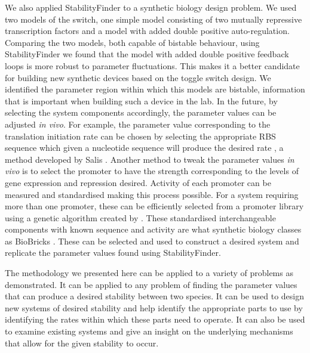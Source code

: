 We also applied StabilityFinder to a synthetic biology design problem. We used two models of the switch, one simple model consisting of two mutually repressive transcription factors and a model with added double positive auto-regulation. Comparing the two models, both capable of bistable behaviour, using StabilityFinder we found that the model with added double positive feedback loops is more robust to parameter fluctuations. This makes it a better candidate for building new synthetic devices based on the toggle switch design. We identified the parameter region within which this models are bistable, information that is important when building such a device in the lab. In the future, by selecting the system components accordingly, the parameter values can be adjusted \textit{in vivo}. For example, the parameter value corresponding to the translation initiation rate can be chosen by selecting the appropriate RBS sequence which given a nucleotide sequence will produce the desired rate \autocite{Holtz:2010bm}, a method developed by Salis \autocite{Salis:2009gk}. Another method to tweak the parameter values \textit{in vivo} is to select the promoter to have the strength corresponding to the levels of gene expression and repression desired. Activity of each promoter can be measured and standardised \autocite{Kelly:2009bj} making this process possible. For a system requiring more than one promoter, these can be efficiently selected from a promoter library using a genetic algorithm created by \textcite{Wu:2011bq}. These standardised interchangeable components with known sequence and activity are what synthetic biology classes as BioBricks \autocite{Kelly:2009bj,Canton:2008fv}. These can be selected and used to construct a desired system and replicate the parameter values found using StabilityFinder.

The methodology we presented here can be applied to a variety of problems as demonstrated. It can be applied to any problem of finding the parameter values that can produce a desired stability between two species. It can be used to design new systems of desired stability and help identify the appropriate parts to use by identifying the rates within which these parts need to operate. It can also be used to examine existing systems and give an insight on the underlying mechanisms that allow for the given stability to occur. 


